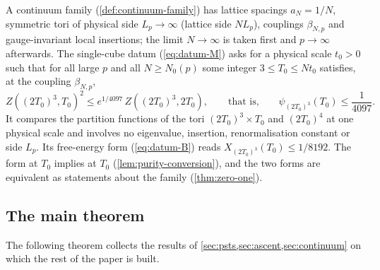 \documentclass[11pt,a4paper]{amsart}
\theoremstyle{definition}
\theoremstyle{remark}
\numberwithin{equation}{section}
\newcommand{\TT}{\mathbb{T}}               %
\newcommand{\Zpart}[2]{Z(#1,#2)}           %
\newcommand{\Zc}{\mathcal{Z}}              %
\newcommand{\XT}[2]{X_{#1}(#2)}            %
\newcommand{\psiT}[2]{\psi_{#1}(#2)}       %
\newcommand{\cube}[1]{(2#1)^3}             %
\newcommand{\dconst}{\frac{1}{4097}}       %
\newcommand{\xconst}{\frac{1}{8192}}       %
\newcommand{\dconstinl}{1/4097}            %
\newcommand{\xconstinl}{1/8192}            %
\newcommand{\Mcirc}{\text{\upshape(M$^{\circ}$)}}   %
\newcommand{\Bcirc}{\text{\upshape(B$^{\circ}$)}}   %
\newcommand{\aN}{a_N}                      %
\newcommand{\tzero}{t_0}                   %
\newcommand{\Tzero}{T_0}                   %
\newcommand{\Lp}{L_p}                      %
\newcommand{\betaNp}{\beta_{N,p}}          %
\begin{document}
A continuum family (\cref{def:continuum-family}) has lattice spacings $\aN=1/N$, symmetric tori of physical side $\Lp\to\infty$ (lattice side $N\Lp$), couplings $\betaNp$ and gauge-invariant local insertions; the limit $N\to\infty$ is taken first and $p\to\infty$ afterwards. The single-cube datum \Mcirc{} (\cref{eq:datum-M}) asks for a physical scale $\tzero>0$ such that for all large $p$ and all $N\ge N_0(p)$ some integer $3\le\Tzero\le N\tzero$ satisfies, at the coupling $\betaNp$,
\begin{equation*}
\Zpart{\cube{T_0}}{T_0}^{2}\le e^{\dconstinl}\,\Zpart{\cube{T_0}}{2T_0},\qquad\text{that is,}\qquad \psiT{\cube{T_0}}{T_0}\le\dconst .
\end{equation*}
It compares the partition functions of the tori $\cube{T_0}\times T_0$ and $(2T_0)^4$ at one physical scale and involves no eigenvalue, insertion, renormalisation constant or side $\Lp$. Its free-energy form \Bcirc{} (\cref{eq:datum-B}) reads $\XT{\cube{T_0}}{T_0}\le\xconstinl$. The form \Mcirc{} at $\Tzero$ implies \Bcirc{} at $\Tzero$ (\cref{lem:purity-conversion}), and the two forms are equivalent as statements about the family (\cref{thm:zero-one}).

\subsection{The main theorem}
The following theorem collects the results of \cref{sec:psts,sec:ascent,sec:continuum} on which the rest of the paper is built.
\end{document}
